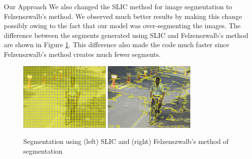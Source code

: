 \documentclass{article}
\begin{document}
\begin{ssection}{Our Approach}
	We also changed the SLIC method for image segmentation to Felzenszwalb's method. We observed much better results by making this change possibly owing to the fact that our model was over-segmenting the images. The difference between the segments generated using SLIC and Felzenszwalb's method are shown in Figure \ref{fig:segmentation}. This difference also made the code much faster since Felzenszwalb's method creates much fewer segments.

	\vspace{6mm}

	\begin{figure}[htpb]
		\centering
		\includegraphics[width=0.4\textwidth]{includes/slic.png}
		\includegraphics[width=0.4\textwidth]{includes/felzenszwalb.png}
		\caption{Segmentation using (left) SLIC and (right) Felzenszwalb's method of segmentation}
		\label{fig:segmentation}
	\end{figure}

\end{ssection}
\newpage
\end{document}
